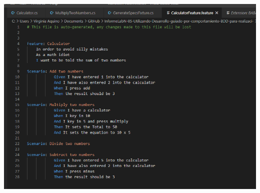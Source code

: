 \begin{itemize}
\begin{center}
\includegraphics[width=\columnwidth]{images/007}\newline
\end{center}
\end{itemize}
